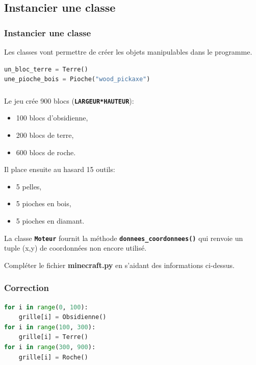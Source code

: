 \documentclass[svgnames,11pt]{beamer}
\begin{document}
\subsection{Instancier une classe}
\begin{frame}[fragile]
    \frametitle{Instancier une classe}

   Les classes vont permettre de créer les objets manipulables dans le programme.
   \begin{center}
   \begin{lstlisting}[language=Python , basicstyle=\small, xleftmargin=2em, xrightmargin=2em]
un_bloc_terre = Terre()
une_pioche_bois = Pioche("wood_pickaxe")
\end{lstlisting}
   \label{CODE}
   \end{center} 
\end{frame}
\begin{frame}
    \frametitle{}
Le jeu crée 900 blocs (\textbf{\texttt{LARGEUR*HAUTEUR}}):
\begin{itemize}
    \item 100 blocs d'obsidienne,
    \item 200 blocs de terre,
    \item 600 blocs de roche.
\end{itemize}
Il place ensuite au hasard 15 outils:
\begin{itemize}
    \item 5 pelles,
    \item 5 pioches en bois,
    \item 5 pioches en diamant.
\end{itemize}
La classe \textbf{\texttt{Moteur}} fournit la méthode \textbf{\texttt{donnees\_coordonnees()}} qui renvoie un tuple (x,y) de coordonnées non encore utilisé.
    \begin{activite}
Compléter le fichier \textbf{minecraft.py} en s'aidant des informations ci-dessus.
    \end{activite}

\end{frame}
\begin{frame}[fragile]
    \frametitle{Correction}

    \begin{center}
    \begin{lstlisting}[language=Python , basicstyle=\small, xleftmargin=2em, xrightmargin=2em]
for i in range(0, 100):
    grille[i] = Obsidienne()
for i in range(100, 300):
    grille[i] = Terre()
for i in range(300, 900):
    grille[i] = Roche()   
\end{lstlisting}
    \label{CODE}
    \end{center}

\end{frame}
\end{document}
